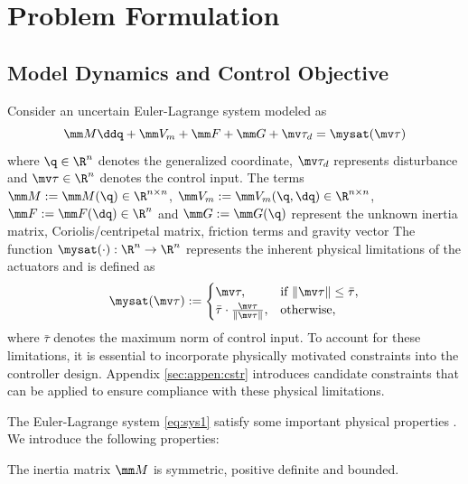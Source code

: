 \documentclass[lettersize,journal]{IEEEtran}
\begin{document}
\section{Problem Formulation}\label{sec:Problem Formulation}

\subsection{Model Dynamics and Control Objective}

Consider an uncertain Euler-Lagrange system modeled as
\begin{equation}
    \mm M\ddq + \mm V_m + \mm F + \mm G + \mv\tau_d
    =
    \mysat(\mv\tau)
    \label{eq:sys1}
\end{equation}
where $\q\in \R^n$ denotes the generalized coordinate, $\mv \tau_d$ represents disturbance and $\mv\tau\in\R^n$ denotes the control input. 
The terms $\mm M:=\mm M(\q)\in\R^{n\times n}$, $\mm V_m:=\mm V_m(\q,\dq)\in\R^{n\times n}$, $\mm F:=\mm F(\dq)\in\R^{n}$ and $\mm G:=\mm G(\q)$ represent the unknown inertia matrix, Coriolis/centripetal matrix, friction terms and gravity vector
The function $\mysat(\cdot):\R^n\to\R^n$ represents the inherent physical limitations of the actuators and is defined as 
\begin{equation}
    \mysat(\mv\tau)
    :=
    \begin{cases}
        \mv\tau, 
        & 
        \text{if } \Vert\mv\tau\Vert\le \bar\tau,
        \\
        \bar\tau
        \cdot
        \tfrac{\mv\tau}{\Vert\mv\tau\Vert}, 
        & 
        \text{otherwise},
    \end{cases}
    \label{eq:sat}
\end{equation}
where $\bar\tau$ denotes the maximum norm of control input.
To account for these limitations, it is essential to incorporate physically motivated constraints into the controller design.
Appendix \ref{sec:appen:cstr} introduces candidate constraints that can be applied to ensure compliance with these physical limitations.

The Euler-Lagrange system \eqref{eq:sys1} satisfy some important physical properties \cite[see, Chap. 3 Tab. 3.2.1]{Lewis:1998aa}.
We introduce the following properties:
\begin{prop} \cite{Lewis:1998aa}
    The inertia matrix $\mm M$ is symmetric, positive definite and bounded.
    \label{prop:M}
\end{prop}
\end{document}
